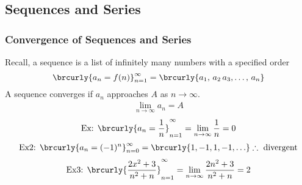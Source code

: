 \subsection{Sequences and Series}
\subsubsection{Convergence of Sequences and Series}
Recall, a sequence is a list of infinitely many numbers with a specified order
$$\brcurly{a_n=f(n)}_{n=1}^\infty=\brcurly{a_1,\,a_2\,a_3,\ldots,\,a_n}$$
A sequence converges if $a_n$ approaches $A$ as $n\to\infty$.
\begin{align*}
    \lim_{n\to\infty}a_n=A
\end{align*}
\begin{align*}
    \text{Ex: }\brcurly{a_n=\frac{1}{n}}_{n=1}^\infty=\lim_{n\to\infty}\frac{1}{n}=0
\end{align*}
\begin{align*}
    \text{Ex2: }\brcurly{a_n=(-1)^n}_{n=0}^\infty=\brcurly{1,-1,1,-1,\ldots}\therefore\text{ divergent}
\end{align*}
\begin{align*}
    \text{Ex3: }\brcurly{\frac{2x^2+3}{n^2+n}}_{n=1}^\infty=\lim_{n\to\infty}\frac{2n^2+3}{n^2+n}=2
\end{align*}

